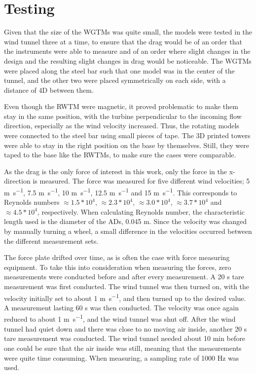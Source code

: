 \section{Testing}
Given that the size of the \gls{WGTM}s was quite small, the models were tested in the wind tunnel three at a time, to ensure that the drag would be of an order that the instruments were able to measure and of an order where slight changes in the design and the resulting slight changes in drag would be noticeable. The \gls{WGTM}s were placed  along the steel bar such that one model was in the center of the tunnel, and the other two were placed symmetrically on each side, with a distance of 4D between them.  %

Even though the \gls{RWTM} were magnetic, it proved problematic to make them stay in the same position, with the turbine perpendicular to the incoming flow direction, especially as the wind velocity increased. Thus, the rotating models were connected to the steel bar using small pieces of tape. The 3D printed towers were able to stay in the right position on the base by themselves. Still, they were taped to the base like the \gls{RWTM}s, to make sure the cases were comparable. 

As the drag is the only force of interest in this work, only the force in the x-direction is measured. The force was measured for five different wind velocities; 5 \si{\m\per\s}, 7.5 \si{\m\per\s}, 10 \si{\m\per\s}, 12.5 \si{\m\per\s} and 15 \si{\m\per\s}. This corresponds to Reynolds numbers $ \approx 1.5*10^4$, $\approx 2.3*10^4$, $ \approx 3.0*10^4$, $\approx 3.7*10^4$ and $\approx 4.5*10^4$, respectively. When calculating Reynolds number, the characteristic length used is the diameter of the \gls{AD}s, 0.045 \si{\m}. Since the velocity was changed by manually turning a wheel, a small difference in the velocities occurred between the different measurement sets. 

The force plate drifted over time, as is often the case with force measuring equipment. To take this into consideration when measuring the forces, zero measurements were conducted before and after every measurement. A 20 \si{\s} tare measurement was first conducted. The wind tunnel was then turned on, with the velocity initially set to about 1 \si{\m\per\s}, and then turned up to the desired value. A measurement lasting 60 \si{s} was then conducted. The velocity was once again reduced to about 1 \si{\m\per\s}, and the wind tunnel was shut off. After the wind tunnel had quiet down and there was close to no moving air inside, another 20 \si{\s} tare measurement was conducted. The wind tunnel needed about 10 \si{\minute} before one could be sure that the air inside was still, meaning that the measurements were quite time consuming. When measuring, a sampling rate of 1000 \si{\hertz} was used.  

